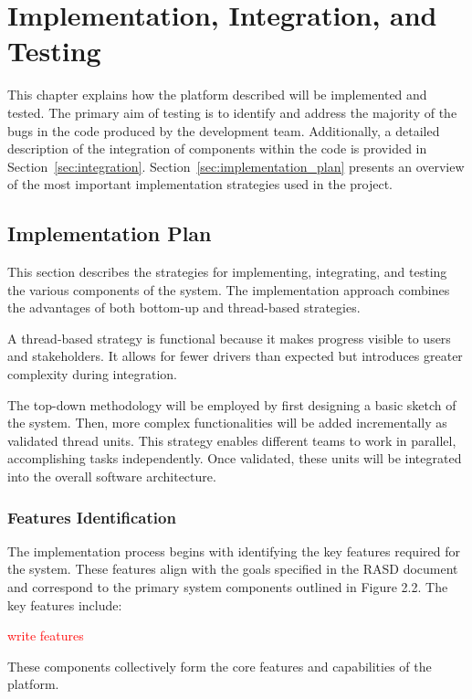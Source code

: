 \chapter{Implementation, Integration, and Testing}

This chapter explains how the platform described will be implemented and tested. The primary aim of testing is to identify and address the majority of the bugs in the code produced by the development team. Additionally, a detailed description of the integration of components within the code is provided in Section~\ref{sec:integration}. Section~\ref{sec:implementation_plan} presents an overview of the most important implementation strategies used in the project.

\section{Implementation Plan\label{sec:implementation_plan}}

This section describes the strategies for implementing, integrating, and testing the various components of the system. The implementation approach combines the advantages of both bottom-up and thread-based strategies.

A thread-based strategy is functional because it makes progress visible to users and stakeholders. It allows for fewer drivers than expected but introduces greater complexity during integration. 

The top-down methodology will be employed by first designing a basic sketch of the system. Then, more complex functionalities will be added incrementally as validated thread units. This strategy enables different teams to work in parallel, accomplishing tasks independently. Once validated, these units will be integrated into the overall software architecture.

\subsection{Features Identification\label{sec:features_identification}}

The implementation process begins with identifying the key features required for the system. These features align with the goals specified in the RASD document and correspond to the primary system components outlined in Figure 2.2. The key features include:

\textcolor{red}{write features}

These components collectively form the core features and capabilities of the platform.

